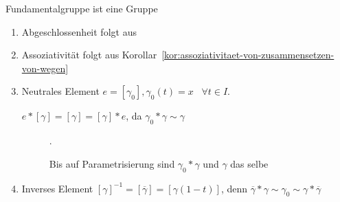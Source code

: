 \begin{beweis}{Fundamentalgruppe ist eine Gruppe}
    \begin{enumerate}[label=\alph*)]
        \item Abgeschlossenheit folgt aus 
        \item Assoziativität folgt aus Korollar~\ref{kor:assoziativitaet-von-zusammensetzen-von-wegen}
        \item Neutrales Element $e = [\gamma_0], \gamma_0(t) = x \;\;\; \forall t \in I$.

        $e * [\gamma] = [\gamma] = [\gamma] * e$, da $\gamma_0 * \gamma \sim \gamma$

        \begin{figure}
            \centering
            
            \caption{Bis auf Parametrisierung sind $\gamma_0 * \gamma$ und $\gamma$ das selbe}.
            \label{fig:weg-zusammengesetzt-mit-neutralem-weg}
        \end{figure}
        \item Inverses Element  $[\gamma]^{-1} = [\overline{\gamma}] = [\gamma(1-t)]$, 
            denn $\overline{\gamma} * \gamma \sim \gamma_0 \sim \gamma * \overline{\gamma}$
    \end{enumerate}
\end{beweis}


